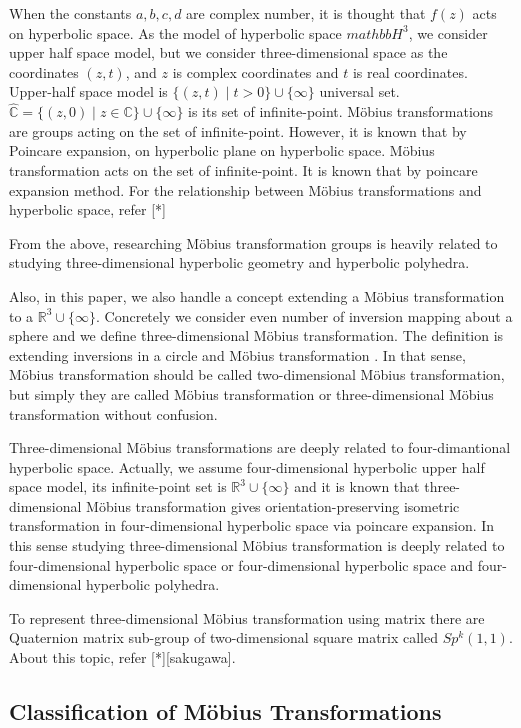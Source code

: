 When the constants $a, b, c, d$ are complex number, it is thought that
$f(z)$ acts on hyperbolic space.
As the model of hyperbolic space $mathbb{H}^3$, we consider upper half
space model, but we consider three-dimensional space as the coordinates
$(z, t)$, and $z$ is complex coordinates and $t$ is real coordinates.
Upper-half space model is $\{(z,t) \mid t>0\}\cup \{ \infty \}$
universal set.
$\hat{\mathbb{C}} = \{ (z,0) \mid z \in \mathbb{C}\} \cup \{ \infty\}$
is its set of infinite-point. M\"obius transformations are groups acting on
the set of infinite-point. However, it is known that by Poincare
expansion, on hyperbolic plane on hyperbolic space.
M\"obius transformation acts on the set of infinite-point. It is known
that by poincare expansion method.
For the relationship between M\"obius transformations and hyperbolic
space, refer [*]

From the above, researching M\"obius transformation groups is heavily
related to studying three-dimensional hyperbolic geometry and hyperbolic
polyhedra.

Also, in this paper, we also handle a concept extending a M\"obius
transformation to a $\mathbb{R}^3\cup\{\infty\}$.
Concretely we consider even number of inversion mapping about a sphere
and we define three-dimensional M\"obius transformation.
The definition is extending inversions in a circle and M\"obius
transformation .
In that sense, M\"obius transformation should be called two-dimensional
M\"obius transformation, but
simply they are called M\"obius transformation or three-dimensional M\"obius
transformation without confusion.

Three-dimensional M\"obius transformations are deeply related to
four-dimantional hyperbolic space. Actually, we assume four-dimensional
hyperbolic upper half space model, its infinite-point set is
$\mathbb{R}^3\cup\{\infty\}$ and it is known that three-dimensional M\"obius
transformation gives orientation-preserving isometric transformation in
four-dimensional hyperbolic space via poincare expansion.
In this sense studying three-dimensional M\"obius transformation is
deeply related to four-dimensional hyperbolic space or four-dimensional
hyperbolic space and four-dimensional hyperbolic polyhedra.

To represent three-dimensional M\"obius transformation using matrix
there are Quaternion matrix sub-group of two-dimensional square matrix called
$Sp^k(1,1)$. About this topic, refer [*][sakugawa].

\subsection{Classification of M\"obius Transformations}

